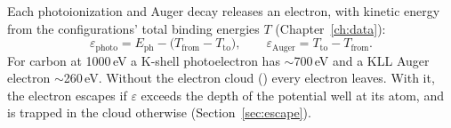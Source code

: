 Each photoionization and Auger decay releases an electron, with kinetic energy from the configurations' total
binding energies $T$ (Chapter~\ref{ch:data}):
\begin{equation}
  \varepsilon_{\mathrm{photo}} = E_{\mathrm{ph}} - \big(T_{\mathrm{from}} - T_{\mathrm{to}}\big),\qquad
  \varepsilon_{\mathrm{Auger}} = T_{\mathrm{to}} - T_{\mathrm{from}}.
\end{equation}
For carbon at 1000\,eV a K-shell photoelectron has $\sim$700\,eV and a KLL Auger electron $\sim$260\,eV.
Without the electron cloud () every electron leaves.
With it, the electron escapes if $\varepsilon$ exceeds the depth of the potential well at its atom, and is trapped in
the cloud otherwise (Section~\ref{sec:escape}).
